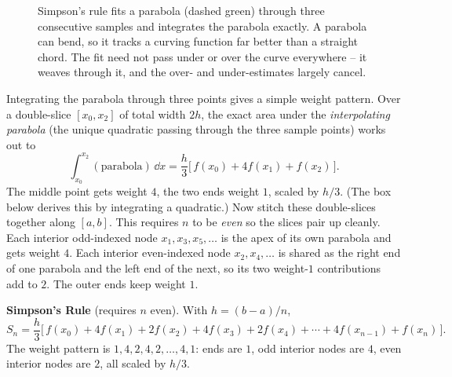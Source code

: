 \begin{figure}[htbp]
\centering
{}
\caption{Simpson's rule fits a parabola (dashed green) through three consecutive samples and integrates the parabola exactly. A parabola can bend, so it tracks a curving function far better than a straight chord. The fit need not pass under or over the curve everywhere -- it weaves through it, and the over- and under-estimates largely cancel.}
\label{ch27:fig-simp}
\end{figure}

Integrating the parabola through three points gives a simple weight pattern. Over a double-slice $[x_0, x_2]$ of total width $2h$, the exact area under the \emph{interpolating parabola} (the unique quadratic passing through the three sample points) works out to
\[
\int_{x_0}^{x_2} (\text{parabola})\,\dd x = \frac{h}{3}\Big[\,f(x_0) + 4 f(x_1) + f(x_2)\,\Big].
\]
The middle point gets weight $4$, the two ends weight $1$, scaled by $h/3$. (The box below derives this by integrating a quadratic.) Now stitch these double-slices together along $[a,b]$. This requires $n$ to be \emph{even} so the slices pair up cleanly. Each interior odd-indexed node $x_1, x_3, x_5, \dots$ is the apex of its own parabola and gets weight $4$. Each interior even-indexed node $x_2, x_4, \dots$ is shared as the right end of one parabola and the left end of the next, so its two weight-$1$ contributions add to $2$. The outer ends keep weight $1$.

\begin{focusbox}
\textbf{Simpson's Rule} (requires $n$ even). With $h = (b-a)/n$,
\[
S_n = \frac{h}{3}\Big[\, f(x_0) + 4f(x_1) + 2f(x_2) + 4f(x_3) + 2f(x_4) + \cdots + 4f(x_{n-1}) + f(x_n)\,\Big].
\]
The weight pattern is $1,4,2,4,2,\dots,4,1$: ends are $1$, odd interior nodes are $4$, even interior nodes are $2$, all scaled by $h/3$.
\end{focusbox}


